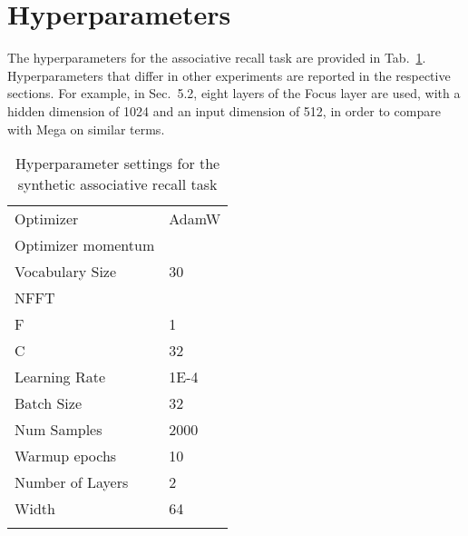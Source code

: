 \documentclass[11pt]{article}
\begin{document}
\section{Hyperparameters}
The hyperparameters for the associative recall task are provided in Tab.~\ref{tab:hyperparameters}. Hyperparameters that differ in other experiments are reported in the respective sections. For example, in Sec.~5.2, eight layers of the Focus layer are used, with a hidden dimension of 1024 and an input dimension of 512, in order to compare with Mega on similar terms. 
\label{sec:appendix}
\begin{table}[h]
\caption{Hyperparameter settings for the synthetic associative recall task}
\begin{tabular}{l l}
\toprule
Optimizer & AdamW\\
Optimizer momentum & \\
Vocabulary Size & 30\\
NFFT & \\
F & 1\\
C & 32 \\
Learning Rate & 1E-4\\
Batch Size & 32\\
Num Samples& 2000\\
Warmup epochs& 10\\
Number of Layers& 2\\
Width& 64\\
\bottomrule
\label{tab:hyperparameters}
\end{tabular}
\end{table}
\smallskip
\end{document}
